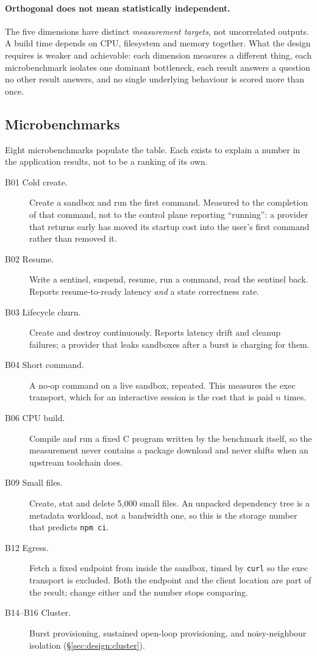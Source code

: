 \paragraph{Orthogonal does not mean statistically independent.} The five
dimensions have distinct \emph{measurement targets}, not uncorrelated outputs.
A build time depends on CPU, filesystem and memory together. What the design
requires is weaker and achievable: each dimension measures a different thing,
each microbenchmark isolates one dominant bottleneck, each result answers a
question no other result answers, and no single underlying behaviour is scored
more than once.

\subsection{Microbenchmarks}

Eight microbenchmarks populate the table. Each exists to explain a number in
the application results, not to be a ranking of its own.

\begin{description}
  \item[B01 Cold create.] Create a sandbox and run the first command.
  Measured to the completion of that command, not to the control plane
  reporting ``running'': a provider that returns early has moved its startup
  cost into the user's first command rather than removed it.
  \item[B02 Resume.] Write a sentinel, suspend, resume, run a command, read
  the sentinel back. Reports resume-to-ready latency \emph{and} a state
  correctness rate.
  \item[B03 Lifecycle churn.] Create and destroy continuously. Reports
  latency drift and cleanup failures; a provider that leaks sandboxes after a
  burst is charging for them.
  \item[B04 Short command.] A no-op command on a live sandbox, repeated. This
  measures the exec transport, which for an interactive session is the cost
  that is paid $n$ times.
  \item[B06 CPU build.] Compile and run a fixed C program written by the
  benchmark itself, so the measurement never contains a package download and
  never shifts when an upstream toolchain does.
  \item[B09 Small files.] Create, stat and delete 5{,}000 small files. An
  unpacked dependency tree is a metadata workload, not a bandwidth one, so
  this is the storage number that predicts \texttt{npm ci}.
  \item[B12 Egress.] Fetch a fixed endpoint from inside the sandbox, timed by
  \texttt{curl} so the exec transport is excluded. Both the endpoint and the
  client location are part of the result; change either and the number stops
  comparing.
  \item[B14--B16 Cluster.] Burst provisioning, sustained open-loop
  provisioning, and noisy-neighbour isolation (\S\ref{sec:design:cluster}).
\end{description}

